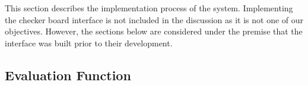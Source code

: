 \documentclass[12pt,a4paper]{article}
\begin{document}

        
    This section describes the implementation process of the system. Implementing the checker board interface is not included in the discussion as it is not one of our objectives. However, the sections below are considered under the premise that the interface was built prior to their development.

    \subsection{Evaluation Function}
\end{document}
